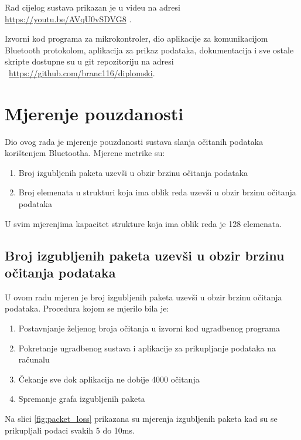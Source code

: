 \documentclass[times, utf8, diplomski]{diplomski}
\begin{document}
Rad cijelog sustava prikazan je u videu na adresi \url{https://youtu.be/AVqU0vSDVG8} \cite{videodemo}.

Izvorni kod programa za mikrokontroler, dio aplikacije za komunikacijom Bluetooth protokolom, aplikacija za prikaz podataka, dokumentacija i sve ostale skripte dostupne su u git repozitoriju na adresi \ \url{https://github.com/branc116/diplomski}.

\newpage
\chapter{Mjerenje pouzdanosti}
Dio ovog rada je mjerenje pouzdanosti sustava slanja očitanih podataka korištenjem Bluetootha. Mjerene metrike su:
\begin{enumerate}
  \item Broj izgubljenih paketa uzevši u obzir brzinu očitanja podataka
  \item Broj elemenata u strukturi koja ima oblik reda uzevši u obzir brzinu očitanja podataka
\end{enumerate}
U svim mjerenjima kapacitet strukture koja ima oblik reda je 128 elemenata.

\section{Broj izgubljenih paketa uzevši u obzir brzinu očitanja podataka}
U ovom radu mjeren je broj izgubljenih paketa uzevši u obzir brzinu očitanja podataka. Procedura kojom se mjerilo bila je:
\begin{enumerate}
  \item Postavnjanje željenog broja očitanja u izvorni kod ugradbenog programa
  \item Pokretanje ugradbenog sustava i aplikacije za prikupljanje podataka na računalu
  \item Čekanje sve dok aplikacija ne dobije 4000 očitanja
  \item Spremanje grafa izgubljenih paketa
\end{enumerate}

Na slici \ref{fig:packet_loss} prikazana su mjerenja izgubljenih paketa kad su se prikupljali podaci svakih 5 do 10ms.
\end{document}
